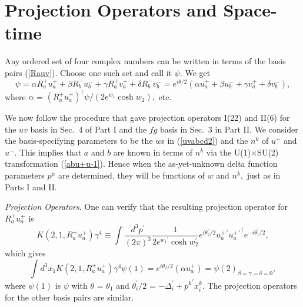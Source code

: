 \documentclass[a4paper,12pt]{article}
\begin{document}
\section{Projection Operators and Space-time} \label{sectionspacetime}%


	Any ordered set of four complex numbers can be written in terms of the basis pairs (\ref{Rauv}). Choose one such set and call it $\psi.$ We get
\begin{equation} \label{psi,ab}
 \psi = \alpha  R_{a}^{+} u_{a}^{+} + \beta R_{b}^{-} u_{b}^{-} + \gamma  R_{a}^{+} v_{a}^{+} + \delta R_{b}^{-} v_{b}^{-} = e^{i \theta/2}(\alpha  u_{a}^{+} + \beta u_{b}^{-} + \gamma  v_{a}^{+} + \delta v_{b}^{-}),
\end{equation}
where $\alpha$ = ${(R_{a}^{+} u_{a}^{+})}^{\dagger} \psi /(2 e^{w_{1}} \cosh w_{2}),$ etc.


	We now follow the procedure that gave projection operators I(22) and II(6) for the $uv$ basis in Sec.~4 of Part I and the $fg$ basis in Sec.~3 in Part II. We consider the basis-specifying parameters to be the $w$s in (\ref{uvabcd2}) and the $n^{k}$ of $u^{+}$ and $u^{-}.$ This implies that $a$ and $b$ are known in terms of $n^{k}$ via the U(1)$\times$SU(2) transformation (\ref{abu+u-1}). Hence when the as-yet-unknown delta function parameters $p^{\mu}$ are determined, they will be functions of $w$ and $n^{k},$ just as in Parts I and II.

	{\textit{Projection Operators}}. One can verify that the resulting projection operator for $R_{a}^{+} u_{a}^{+}$ is
\begin{equation}	\label{K(2,1)ab}
  K(2,1,R_{a}^{+} u_{a}^{+}) \gamma^{4} \equiv \int \frac{d^3 p^{\prime} }{(2 \pi)^3} \frac{1}{2 e^{{w_{1}}^{\prime}} \cosh w_{2}^{\prime}}e^{i \theta_{2}^{\prime}/2}  u_{a}^{+ \, \prime} {u_{a}^{+ \, \prime }}^{\dagger} e^{ -i \theta_{1}^{\prime}/2} ,
\end{equation} 
which gives
\begin{equation}	\label{K(2,1)psiab}
 \int d^{3} x_{1} K(2,1,R_{a}^{+} u_{a}^{+}) \gamma^{4} \psi(1) =  e^{i \theta_{2} / 2} (\alpha  u_{a}^{+}) = \psi(2)_{\beta = \gamma = \delta = 0},
\end{equation}
where $\psi(1)$ is $\psi$ with $\theta$ = $\theta_{1}$ and $ \theta_{i}^{\prime}/2 $ = $- \Delta_{i}^{\prime} +  {p^{k }}^{\prime} x_{i}^{k} .$ The projection operators for the other basis pairs are similar.
\end{document}
